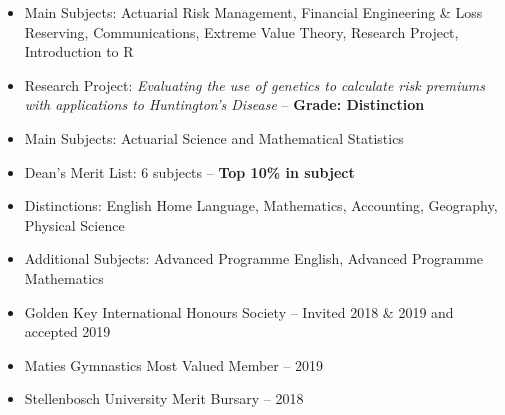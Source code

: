 \documentclass[10pt,a4paper]{altacv}
\begin{document}


\begin{itemize}
    \setlength{\itemindent}{0.5em}
    \item   \small{Main Subjects: Actuarial Risk Management, Financial Engineering \& Loss Reserving, Communications, Extreme Value Theory, Research Project, Introduction to R}
    \item   \small{Research Project: \textit{Evaluating the use of genetics to calculate risk premiums with applications to Huntington's Disease} -- \textbf{Grade: Distinction}}
\end{itemize}

\medskip



\begin{itemize}
    \setlength{\itemindent}{0.5em}
    \item   \small{Main Subjects: Actuarial Science and Mathematical Statistics}
    \item \small{Dean's Merit List: 6 subjects -- \textbf{Top 10\% in subject}}
\end{itemize}
\medskip
{}

\begin{itemize}
    \setlength{\itemindent}{0.5em}
    \item   \small{Distinctions: English Home Language, Mathematics, Accounting, Geography, Physical Science}
    \item   \small{Additional Subjects: Advanced Programme English, Advanced Programme Mathematics}
\end{itemize}

\begin{itemize}
    \setlength{\itemindent}{0.5em}
    \item \small{Golden Key International Honours Society -- Invited 2018 \& 2019 and accepted 2019}
    \item \small{Maties Gymnastics Most Valued Member -- 2019} 
    \item \small{Stellenbosch University Merit Bursary -- 2018}
\end{itemize}


\end{document}
